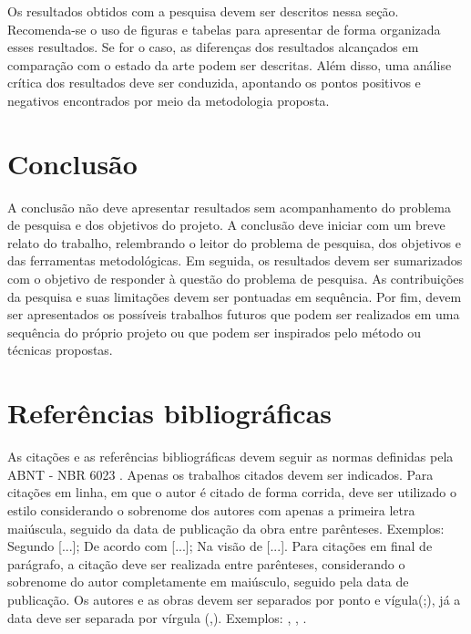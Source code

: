 \documentclass[
	article,			%
	11pt,				%
	oneside,			%
	a4paper,			%
	english,			%
	brazil,				%
	sumario=tradicional
	]{abntex2}
\begin{document}
Os resultados obtidos com a pesquisa devem ser descritos nessa seção. Recomenda-se o uso de figuras e tabelas para apresentar de forma organizada esses resultados. Se for o caso, as diferenças dos resultados alcançados em comparação com o estado da arte podem ser descritas. Além disso, uma análise crítica dos resultados deve ser conduzida, apontando os pontos positivos e negativos encontrados por meio da metodologia proposta.

\section{Conclusão}

A conclusão não deve apresentar resultados sem acompanhamento do problema de pesquisa e dos objetivos do projeto.
A conclusão deve iniciar com um breve relato do trabalho, relembrando o leitor do problema de pesquisa, dos objetivos e das ferramentas metodológicas. Em seguida, os resultados devem ser sumarizados com o objetivo de responder à questão do problema de pesquisa. As contribuições da pesquisa e suas limitações devem ser pontuadas em sequência. Por fim, devem ser apresentados os possíveis trabalhos futuros que podem ser realizados em uma sequência do próprio projeto ou que podem ser inspirados pelo método ou técnicas propostas.


\section{Referências bibliográficas}

As citações e as referências bibliográficas devem seguir as normas definidas pela ABNT - NBR 6023 \cite{abnt2018}. Apenas os trabalhos citados devem ser indicados.
Para citações em linha, em que o autor é citado de forma corrida, deve ser utilizado o estilo considerando o sobrenome dos autores com apenas a primeira letra maiúscula, seguido da data de publicação da obra entre parênteses. Exemplos: Segundo [...]; De acordo com [...]; Na visão de [...].
Para citações em final de parágrafo, a citação deve ser realizada entre parênteses, considerando o sobrenome do autor completamente em maiúsculo, seguido pela data de publicação. Os autores e as obras devem ser separados por ponto e vígula(;), já a data deve ser separada por vírgula (,). Exemplos: \cite{szeliski2021}, \cite{russell2021, szeliski2021}, \cite{hameed2019, arora2021, karthik2022}.

\nocite{upm2021}
\nocite{sato2020}




\postextual



\end{document}
